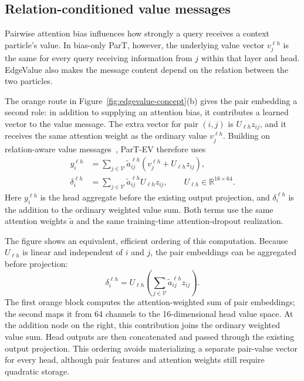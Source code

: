 \subsection{Relation-conditioned value messages}
\label{sec:edgevalue}

Pairwise attention bias influences how strongly a query receives a context
particle's value. In bias-only ParT, however, the underlying value vector
$v_j^{\ell h}$ is the same for every query receiving information from $j$
within that layer and head. EdgeValue also makes the message content depend
on the relation between the two particles.

The orange route in Figure~\ref{fig:edgevalue-concept}(b) gives the pair
embedding a second role: in addition to supplying an attention bias, it
contributes a learned vector to the value message. The extra vector for
pair $(i,j)$ is $U_{\ell h}z_{ij}$, and it receives the same attention weight
as the ordinary value $v_j^{\ell h}$. Building on relation-aware value
messages~\cite{Shaw2018Relative}, ParT-EV therefore uses
\begin{align}
 y_i^{\ell h}
 &=\sum_{j\in\mathcal V}\widetilde a^{\ell h}_{ij}
   \left(v_j^{\ell h}+U_{\ell h}z_{ij}\right),
 \label{eq:edgevalue}\\
 \delta_i^{\ell h}
 &=\sum_{j\in\mathcal V}\widetilde a^{\ell h}_{ij}U_{\ell h}z_{ij},
 \qquad U_{\ell h}\in\mathbb R^{16\times64}.
 \label{eq:edgevalue-message}
\end{align}
Here $y_i^{\ell h}$ is the head aggregate before the existing output projection,
and $\delta_i^{\ell h}$ is the addition to the ordinary weighted value sum.
Both terms use the same attention weights $\widetilde a$ and the same
training-time attention-dropout realization.

The figure shows an equivalent, efficient ordering of this computation.
Because $U_{\ell h}$ is linear and independent of $i$ and $j$, the pair
embeddings can be aggregated before projection:
\begin{equation}
 \delta_i^{\ell h}
 =U_{\ell h}\left(\sum_{j\in\mathcal V}
   \widetilde a^{\ell h}_{ij}z_{ij}\right).
 \label{eq:edgevalue-efficient}
\end{equation}
The first orange block computes the attention-weighted sum of pair embeddings;
the second maps it from 64 channels to the 16-dimensional head value space.
At the addition node on the right, this contribution joins the ordinary
weighted value sum. Head outputs are then concatenated and passed through
the existing output projection. This ordering avoids materializing a separate
pair-value vector for every head, although pair features and attention weights
still require quadratic storage.

